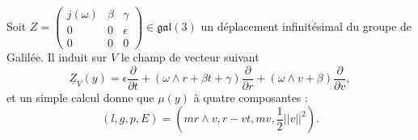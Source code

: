 Soit $Z=\begin{pmatrix}
j(\omega) & \beta & \gamma\\
0 & 0 & \epsilon \\
0&0 & 0  \end{pmatrix}\in \mathfrak{gal}(3)$ un déplacement infinitésimal du groupe de Galilée. Il induit sur $V$ le champ de vecteur suivant
\[\underline Z_V(y) =\epsilon \frac{\partial}{\partial t} + (\omega \wedge r+\beta t +\gamma)\frac{\partial}{\partial r}+ 
(\omega\wedge v+\beta)\frac{\partial}{\partial v}, \]
et un simple calcul donne que $\mu(y)$ à quatre composantes : 
\[(l,g,p,E)=\left(m r\wedge v ,r-vt,mv,\frac{1}{2}||v||^2\right).\]
































